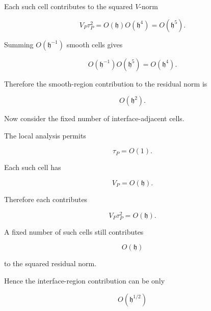 \documentclass[11pt,a4paper]{article}
\begin{document}
Each such cell contributes to the squared $V$-norm

\begin{equation}
V_P\tau_P^2
=
O(\mathfrak h)
O(\mathfrak h^4)
=
O(\mathfrak h^5).
\tag{TRISO-ACC-286}
\label{eq:triso-acc-286}
\end{equation}

Summing $O(\mathfrak h^{-1})$ smooth cells gives

\begin{equation}
O(\mathfrak h^{-1})
O(\mathfrak h^5)
=
O(\mathfrak h^4).
\tag{TRISO-ACC-287}
\label{eq:triso-acc-287}
\end{equation}

Therefore the smooth-region contribution to the residual norm is

\begin{equation}
O(\mathfrak h^2).
\tag{TRISO-ACC-288}
\label{eq:triso-acc-288}
\end{equation}

Now consider the fixed number of interface-adjacent cells.

The local analysis permits

\begin{equation}
\tau_P=O(1).
\tag{TRISO-ACC-289}
\label{eq:triso-acc-289}
\end{equation}

Each such cell has

\begin{equation}
V_P=O(\mathfrak h).
\tag{TRISO-ACC-290}
\label{eq:triso-acc-290}
\end{equation}

Therefore each contributes

\begin{equation}
V_P\tau_P^2
=
O(\mathfrak h).
\tag{TRISO-ACC-291}
\label{eq:triso-acc-291}
\end{equation}

A fixed number of such cells still contributes

\begin{equation}
O(\mathfrak h)
\tag{TRISO-ACC-292}
\label{eq:triso-acc-292}
\end{equation}

to the squared residual norm.

Hence the interface-region contribution can be only

\begin{equation}
\boxed{
O(\mathfrak h^{1/2})
}
\tag{TRISO-ACC-293}
\label{eq:triso-acc-293}
\end{equation}
\end{document}
